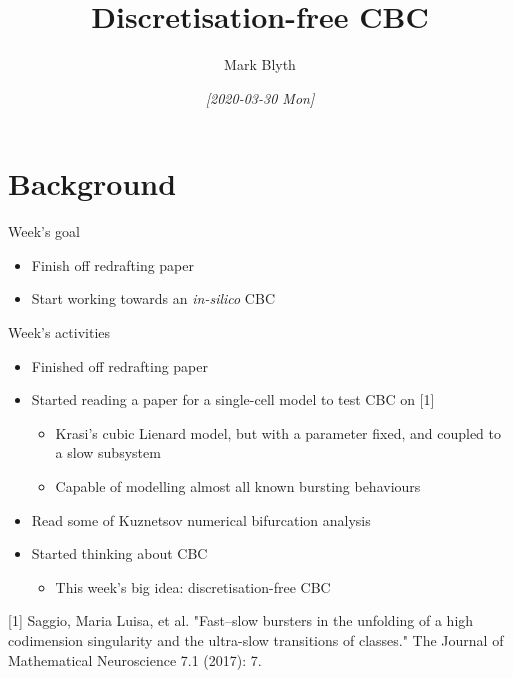 \documentclass[presentation]{beamer}
\author{Mark Blyth}
\date{\textit{[2020-03-30 Mon]}}
\title{Discretisation-free CBC}
\begin{document}
\maketitle

\section{Background}
\label{sec:org7f22efa}
\begin{frame}[label={sec:org8897243}]{Week's goal}
\begin{itemize}
\item Finish off redrafting paper
\item Start working towards an \emph{in-silico} CBC
\end{itemize}
\end{frame}

\begin{frame}[label={sec:org49befb9}]{Week's activities}
\begin{itemize}
\item Finished off redrafting paper
\item Started reading a paper for a single-cell model to test CBC on [1]
\begin{itemize}
\item Krasi's cubic Lienard model, but with a parameter fixed, and coupled to a slow subsystem
\item Capable of modelling almost all known bursting behaviours
\end{itemize}
\item Read some of Kuznetsov numerical bifurcation analysis
\item Started thinking about CBC
\begin{itemize}
\item This week's big idea: discretisation-free CBC
\end{itemize}
\end{itemize}

\vfill

[1] Saggio, Maria Luisa, et al. "Fast–slow bursters in the unfolding of a high codimension singularity and the ultra-slow transitions of classes." The Journal of Mathematical Neuroscience 7.1 (2017): 7.
\end{frame}
\end{document}

